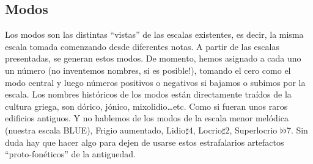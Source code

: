 \documentclass[]{article}
\begin{document}
\subsection{Modos}
Los modos son las distintas ``vistas'' de las escalas existentes, es decir, la misma escala tomada comenzando desde diferentes notas.
A partir de las escalas presentadas, se generan estos modos. De momento, hemos asignado a cada uno un número (no inventemos nombres, si es posible!), tomando el cero como el modo central y luego números positivos o negativos si bajamos o subimos por la escala. Los nombres históricos de los modos están directamente traídos de la cultura griega, son \textsf{dórico}, \textsf{jónico}, \textsf{mixolidio}\ldots etc. Como si fueran unos raros edificios antiguos. Y no hablemos de los modos de la escala menor melódica (nuestra escala \textsf{BLUE}), \textsf{Frigio aumentado}, \textsf{Lidio$\sharp$4}, \textsf{Locrio$\sharp$2}, \textsf{Superlocrio $\flat$$\flat$7}. Sin duda hay que hacer algo para dejen de usarse estos estrafalarios artefactos ``proto-fonéticos'' de la antiguedad.
\end{document}
